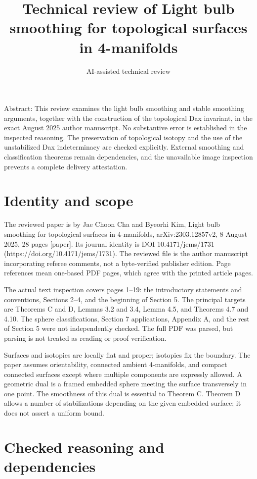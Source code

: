 \documentclass[10pt]{article}
\title{Technical review of Light bulb smoothing for topological surfaces in 4-manifolds}
\author{AI-assisted technical review}
\date{}
\begin{document}
\maketitle
Abstract: This review examines the light bulb smoothing and stable smoothing arguments, together with the construction of the topological Dax invariant, in the exact August 2025 author manuscript. No substantive error is established in the inspected reasoning. The preservation of topological isotopy and the use of the unstabilized Dax indeterminacy are checked explicitly. External smoothing and classification theorems remain dependencies, and the unavailable image inspection prevents a complete delivery attestation.\par
\section*{Identity and scope}
The reviewed paper is by Jae Choon Cha and Byeorhi Kim, Light bulb smoothing for topological surfaces in 4-manifolds, arXiv:2303.12857v2, 8 August 2025, 28 pages [paper]. Its journal identity is DOI 10.4171/jems/1731 (https://doi.org/10.4171/jems/1731). The reviewed file is the author manuscript incorporating referee comments, not a byte-verified publisher edition. Page references mean one-based PDF pages, which agree with the printed article pages.\par
The actual text inspection covers pages 1–19: the introductory statements and conventions, Sections 2–4, and the beginning of Section 5. The principal targets are Theorems C and D, Lemmas 3.2 and 3.4, Lemma 4.5, and Theorems 4.7 and 4.10. The sphere classifications, Section 7 applications, Appendix A, and the rest of Section 5 were not independently checked. The full PDF was parsed, but parsing is not treated as reading or proof verification.\par
Surfaces and isotopies are locally flat and proper; isotopies fix the boundary. The paper assumes orientability, connected ambient 4-manifolds, and compact connected surfaces except where multiple components are expressly allowed. A geometric dual is a framed embedded sphere meeting the surface transversely in one point. The smoothness of this dual is essential to Theorem C. Theorem D allows a number of stabilizations depending on the given embedded surface; it does not assert a uniform bound.\par
\section*{Checked reasoning and dependencies}
\end{document}
